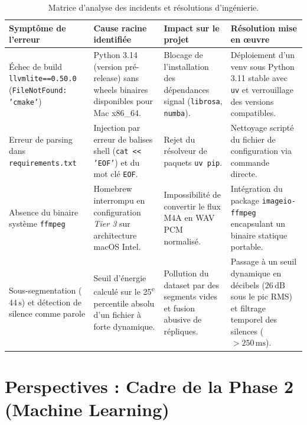 \documentclass[10pt,a4paper,twocolumn]{article}
\begin{document}
\begin{table}[t]
\centering
\caption{Matrice d'analyse des incidents et résolutions d'ingénierie.}
\label{tab:issues}
\vspace{0.15cm}
\small
\begin{tabularx}{\textwidth}{p{3.8cm}p{4.2cm}p{4.5cm}X}
\toprule
\textbf{Symptôme de l'erreur} & \textbf{Cause racine identifiée} & \textbf{Impact sur le projet} & \textbf{Résolution mise en œuvre} \\
\midrule
Échec de build \texttt{llvmlite==0.50.0} (\texttt{FileNotFound: 'cmake'}) & Python 3.14 (version pré-release) sans wheels binaires disponibles pour Mac x86\_64. & Blocage de l'installation des dépendances signal (\texttt{librosa}, \texttt{numba}). & Déploiement d'un venv sous Python 3.11 stable avec \texttt{uv} et verrouillage des versions compatibles. \\
\addlinespace
Erreur de parsing dans \texttt{requirements.txt} & Injection par erreur de balises shell (\texttt{cat << 'EOF'}) et du mot clé \texttt{EOF}. & Rejet du résolveur de paquets \texttt{uv pip}. & Nettoyage scripté du fichier de configuration via commande directe. \\
\addlinespace
Absence du binaire système \texttt{ffmpeg} & Homebrew interrompu en configuration \textit{Tier 3} sur architecture macOS Intel. & Impossibilité de convertir le flux M4A en WAV PCM normalisé. & Intégration du package \texttt{imageio-ffmpeg} encapsulant un binaire statique portable. \\
\addlinespace
Sous-segmentation ($44\,\text{s}$) et détection de silence comme parole & Seuil d'énergie calculé sur le 25\textsuperscript{e} percentile absolu d'un fichier à forte dynamique. & Pollution du dataset par des segments vides et fusion abusive de répliques. & Passage à un seuil dynamique en décibels ($26\,\text{dB}$ sous le pic RMS) et filtrage temporel des silences ($> 250\,\text{ms}$). \\
\bottomrule
\end{tabularx}
\end{table}

\section{Perspectives : Cadre de la Phase 2 (Machine Learning)}
\end{document}
